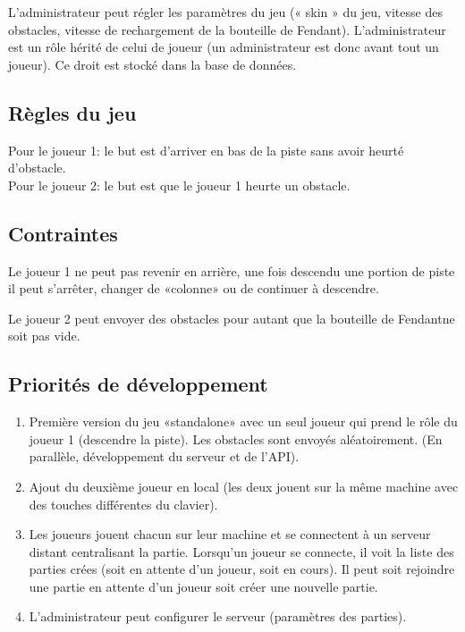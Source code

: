 \documentclass[a4paper,11pt]{article}
\begin{document}
	L'administrateur peut régler les paramètres du jeu (« skin » du jeu, vitesse des obstacles, vitesse de rechargement de la bouteille de Fendant\texttrademark). L'administrateur est un rôle hérité de celui de joueur (un administrateur est donc avant tout un joueur). Ce droit est stocké dans la base de données.
	
	
	\subsection{Règles du jeu}
	Pour le joueur 1: le but est d'arriver en bas de la piste sans avoir heurté d'obstacle. \\
	Pour le joueur 2: le but est que le joueur 1 heurte un obstacle.
	
	
	\subsection{Contraintes}
	Le joueur 1 ne peut pas revenir en arrière, une fois descendu une portion de piste il peut s'arrêter, changer de «colonne» ou de continuer à descendre. \par
	
	Le joueur 2 peut envoyer des obstacles pour autant que la bouteille de Fendant\texttrademark ne soit pas vide.
	
	
	\subsection{Priorités de développement}
	\begin{enumerate}
		\item Première version du jeu «standalone» avec un seul joueur qui prend le rôle du joueur 1 (descendre la piste). Les obstacles sont envoyés aléatoirement. (En parallèle, développement du serveur et de l'API).
		\item Ajout du deuxième joueur en local (les deux jouent sur la même machine avec des touches différentes du clavier).
		\item Les joueurs jouent chacun sur leur machine et se connectent à un serveur distant centralisant la partie. Lorsqu'un joueur se connecte, il voit la liste des parties crées (soit en attente d'un joueur, soit en cours). Il peut soit rejoindre une partie en attente d'un joueur soit créer une nouvelle partie.
		\item L'administrateur peut configurer le serveur (paramètres des parties).
	\end{enumerate}
	
\end{document}
